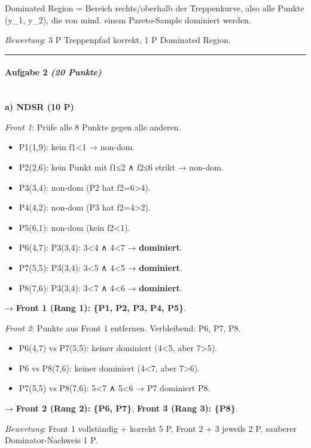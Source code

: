 \documentclass[11pt, a4paper]{article}
\begin{document}
Dominated Region = Bereich rechts/oberhalb der Treppenkurve, also alle Punkte (y\_1, y\_2), die von mind. einem Pareto-Sample dominiert werden.


\textit{Bewertung}: 3 P Treppenpfad korrekt, 1 P Dominated Region.



\noindent\textcolor{rulegray}{\rule{\linewidth}{0.4pt}}


\paragraph{Aufgabe 2 \textit{(20 Punkte)}}\mbox{}\\[2pt]

\textbf{a) NDSR (10 P)}


\textit{Front 1}: Prüfe alle 8 Punkte gegen alle anderen.

\begin{itemize}
  \item P1(1,9): kein f1<1 → non-dom.
  \item P2(2,6): kein Punkt mit f1≤2 ∧ f2≤6 strikt → non-dom.
  \item P3(3,4): non-dom (P2 hat f2=6>4).
  \item P4(4,2): non-dom (P3 hat f2=4>2).
  \item P5(6,1): non-dom (kein f2<1).
  \item P6(4,7): P3(3,4): 3<4 ∧ 4<7 → \textbf{dominiert}.
  \item P7(5,5): P3(3,4): 3<5 ∧ 4<5 → \textbf{dominiert}.
  \item P8(7,6): P3(3,4): 3<7 ∧ 4<6 → \textbf{dominiert}.
\end{itemize}

→ \textbf{Front 1 (Rang 1): \{P1, P2, P3, P4, P5\}}.


\textit{Front 2}: Punkte aus Front 1 entfernen. Verbleibend: P6, P7, P8.

\begin{itemize}
  \item P6(4,7) vs P7(5,5): keiner dominiert (4<5, aber 7>5).
  \item P6 vs P8(7,6): keiner dominiert (4<7, aber 7>6).
  \item P7(5,5) vs P8(7,6): 5<7 ∧ 5<6 → P7 dominiert P8.
\end{itemize}

→ \textbf{Front 2 (Rang 2): \{P6, P7\}}, \textbf{Front 3 (Rang 3): \{P8\}}.


\textit{Bewertung}: Front 1 vollständig + korrekt 5 P, Front 2 + 3 jeweils 2 P, sauberer Dominator-Nachweis 1 P.
\end{document}
